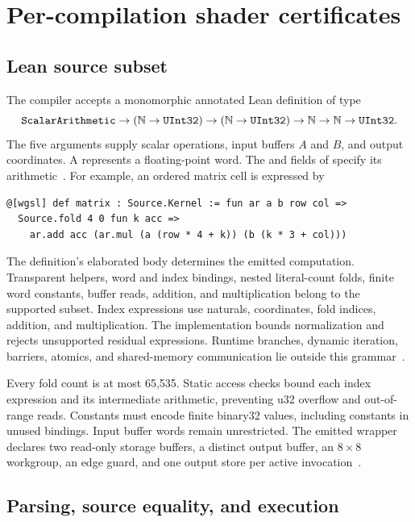 \section{Per-compilation shader certificates}

\subsection{Lean source subset}

The compiler accepts a monomorphic annotated Lean definition of type
\[
\texttt{ScalarArithmetic}\to(\mathbb N\to\texttt{UInt32})\to
(\mathbb N\to\texttt{UInt32})\to\mathbb N\to\mathbb N\to\texttt{UInt32}.
\]
The five arguments supply scalar operations, input buffers $A$ and $B$, and output coordinates.  A  represents a floating-point word.  The  and  fields of  specify its arithmetic~\cite{wg-compiler}.  For example, an ordered matrix cell is expressed by
\begin{verbatim}
@[wgsl] def matrix : Source.Kernel := fun ar a b row col =>
  Source.fold 4 0 fun k acc =>
    ar.add acc (ar.mul (a (row * 4 + k)) (b (k * 3 + col)))
\end{verbatim}
The definition's elaborated body determines the emitted computation.  Transparent helpers, word and index bindings, nested literal-count folds, finite word constants, buffer reads, addition, and multiplication belong to the supported subset.  Index expressions use naturals, coordinates, fold indices, addition, and multiplication.  The implementation bounds normalization and rejects unsupported residual expressions.  Runtime branches, dynamic iteration, barriers, atomics, and shared-memory communication lie outside this grammar~\cite{wg-compiler}.

Every fold count is at most 65,535.  Static access checks bound each index expression and its intermediate arithmetic, preventing u32 overflow and out-of-range reads.  Constants must encode finite binary32 values, including constants in unused bindings.  Input buffer words remain unrestricted.  The emitted wrapper declares two read-only storage buffers, a distinct output buffer, an $8\times8$ workgroup, an edge guard, and one output store per active invocation~\cite{wg-compiler,wg-execution}.

\subsection{Parsing, source equality, and execution}

